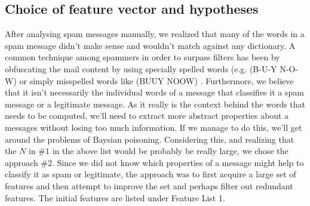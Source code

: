 \subsection{Choice of feature vector and hypotheses}
After analysing spam messages manually, we realized that many of the
words in a spam message didn't make sense and wouldn't match against any
dictionary. A common technique among spammers in order to surpass
filters has been by obfuscating the mail content by using specially spelled
words (e.g. (B-U-Y N-O-W) or simply misspelled words like (BUUY NOOW)
\cite{machine-learning-methods-spam}. Furthermore, we believe that it isn't
necessarily the individual words of a message that classifies it a spam message
or a legitimate message. As it really is the context behind the words that
needs to be computed, we'll need to extract more abstract properties about a
messages without losing too much information. If we manage to do this, we'll
get around the problems of Baysian poisoning. 
Considering this, and realizing that the $N$ in \#$1$ in the above
list would be probably be really large, we chose the approach \#$2$. Since we
did not know which properties of a message might help to classify it as spam or
legitimate, the approach was to first acquire a large set of features and then
attempt to improve the set and perhaps filter out redundant features. The
initial features are listed under Feature List 1. 

